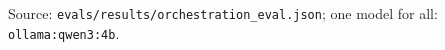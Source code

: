 Source: \texttt{evals/results/orchestration\_eval.json}; one model for all: \texttt{ollama:qwen3:4b}.
